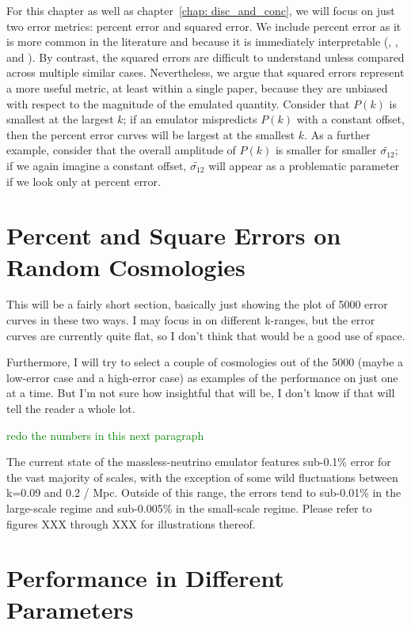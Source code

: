 For this chapter as well as chapter~\ref{chap: disc_and_conc}, we will focus
on just two error metrics: percent error and squared error. We include percent
error as it is more common in the literature and because it is immediately
interpretable (\citealp{Mancini}, \citealp{Arico}, and
\citealp{Eggemeier}). By contrast, the squared errors are difficult to
understand unless compared across multiple similar cases.
Nevertheless, we argue
that squared errors represent a more useful metric, at least within a single
paper, because they are unbiased with respect to the magnitude of the emulated
quantity. Consider that $P(k)$ is smallest at the largest $k$; if an emulator
mispredicts $P(k)$ with a constant offset, then the percent error curves will
be largest at the smallest $k$. As a further example, consider that the
overall amplitude of $P(k)$ is smaller for smaller $\tilde{\sigma_{12}}$;
if we again imagine a constant offset, $\tilde{\sigma_{12}}$ will appear as a
problematic parameter if we look only at percent error.


\section{Percent and Square Errors on Random Cosmologies}

This will be a fairly short section, basically just showing the plot of 5000 
error curves in these two ways. I may focus in on different k-ranges, but the 
error curves are currently quite flat, so I don't think that would be a good 
use of space.

Furthermore, I will try to select a couple of cosmologies out of the 5000 
(maybe a low-error case and a high-error case) as examples of the performance 
on just one at a time. But I'm not sure how insightful that will be, I don't 
know if that will tell the reader a whole lot.

\textcolor{green}{redo the numbers in this next paragraph}

The current state of the massless-neutrino emulator features sub-0.1\% error 
for the vast majority of scales, with the exception of some wild fluctuations  
between k=0.09 and 0.2 / Mpc. Outside of this range, the errors tend to 
sub-0.01\% in the large-scale regime and sub-0.005\% in the small-scale 
regime. Please refer to figures XXX through XXX for illustrations thereof.


\section{Performance in Different Parameters}

